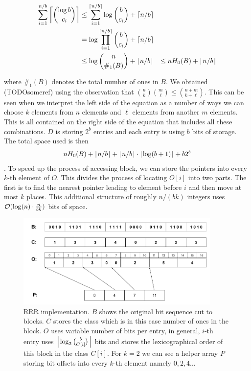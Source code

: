 \begin{align*}
    \sum_{i=1}^{n/b} \left\lceil {\log b\choose c_i} \right\rceil
    &\leq \sum_{i=1}^{\left\lceil n/b \right\rceil} \log {b\choose c_i} + \left\lceil n/b \right\rceil \\
    &= \log\prod_{i=1}^{\left\lceil n/b \right\rceil} {b\choose c_i} + \left\lceil n/b \right\rceil \\
    &\leq \log{n\choose \#_1(B)} + \left\lceil n/b \right\rceil &\leq nH_0(B) + \left\lceil n/b \right\rceil
\end{align*}

where $\#_1(B)$ denotes the total number of ones in $B$. We obtained (TODOsomeref) using the
observation that ${n\choose k} {m\choose \ell} \leq {n+m\choose k+\ell}$. This can be seen
when we interpret the left side of the equation as a number of ways we can choose $k$ elements
from $n$ elements and $\ell$ elements from another $m$ elements. This is all contained on the
right side of the equation that includes all these combinations. $D$ is storing $2^b$ entries
and each entry is using $b$ bits of storage. The total space used is then
$$nH_0(B) + \left\lceil n/b \right\rceil + \left\lceil n/b \right\rceil \cdot \left\lceil \log(b+1) \right\rceil + b2^b$$. To speed up the process
of accessing block, we can store the pointers into every $k$-th element of $O$. This divides
the process of locating $O[i]$ into two parts. The first is to find the nearest pointer leading
to element before $i$ and then move at most $k$ places. This additional structure of roughly
$n/(bk)$ integers uses $\mathcal{O}(\log(n)\cdot \frac{n}{bk})$ bits of space.

\begin{figure}
	\centerline{
		\includegraphics[width=0.9\textwidth, height=0.3\textheight]{images/rrr}
	}
	\caption[TODO]{RRR implementation. $B$ shows the original bit sequence cut to
    blocks. $C$ stores the class which is in this case number of ones in the block.
    $O$ uses variable number of bits per entry, in general, $i$-th entry uses
    $\left\lceil \log_2{b\choose C[i]} \right\rceil$ bits and stores the lexicographical order
    of this block in the class $C[i]$. For $k=2$ we can see a helper array $P$
    storing bit offsets into every $k$-th element namely $0, 2, 4\ldots$
	}
	\label{obr:RRRFinal}
\end{figure}

